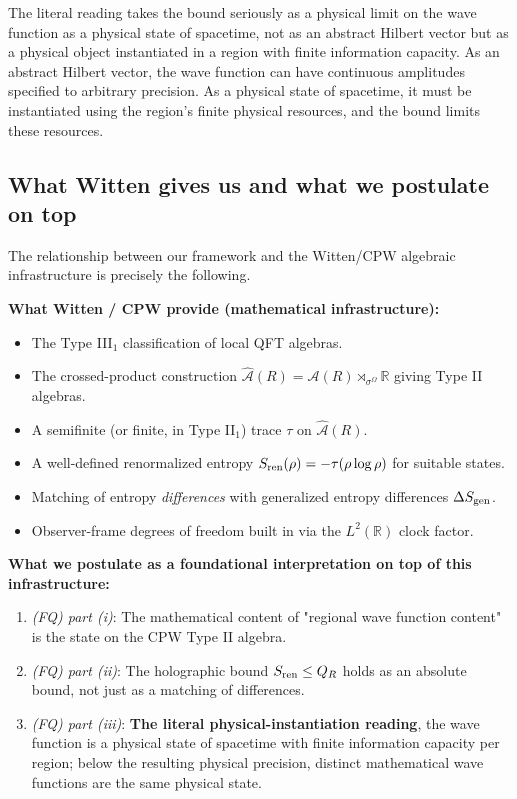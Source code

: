 \documentclass[11pt,a4paper]{article}
\begin{document}
The literal reading takes the bound seriously as a physical limit on the wave function as a physical state of spacetime, not as an abstract Hilbert vector but as a physical object instantiated in a region with finite information capacity. As an abstract Hilbert vector, the wave function can have continuous amplitudes specified to arbitrary precision. As a physical state of spacetime, it must be instantiated using the region's finite physical resources, and the bound limits these resources.

\subsection{What Witten gives us and what we postulate on top}

The relationship between our framework and the Witten/CPW algebraic infrastructure is precisely the following.

\textbf{What Witten / CPW provide (mathematical infrastructure):}
\begin{itemize}
  \item The Type III$_1$ classification of local QFT algebras.
  \item The crossed-product construction $\hat{\mathcal{A}}(R) = \mathcal{A}(R) \rtimes_{\sigma^\Omega} \mathbb{R}$ giving Type II algebras.
  \item A semifinite (or finite, in Type II$_1$) trace $\tau$ on $\hat{\mathcal{A}}(R)$.
  \item A well-defined renormalized entropy $S_{\rm ren}(\rho) = -\tau(\rho \log \rho)$ for suitable states.
  \item Matching of entropy \emph{differences} with generalized entropy differences $\Delta S_{\rm gen}$.
  \item Observer-frame degrees of freedom built in via the $L^2(\mathbb{R})$ clock factor.
\end{itemize}

\textbf{What we postulate as a foundational interpretation on top of this infrastructure:}
\begin{enumerate}
  \item \emph{(FQ) part (i)}: The mathematical content of "regional wave function content" is the state on the CPW Type II algebra.
  \item \emph{(FQ) part (ii)}: The holographic bound $S_{\rm ren} \le Q_R$ holds as an absolute bound, not just as a matching of differences.
  \item \emph{(FQ) part (iii)}: \textbf{The literal physical-instantiation reading}, the wave function is a physical state of spacetime with finite information capacity per region; below the resulting physical precision, distinct mathematical wave functions are the same physical state.
\end{enumerate}
\end{document}

